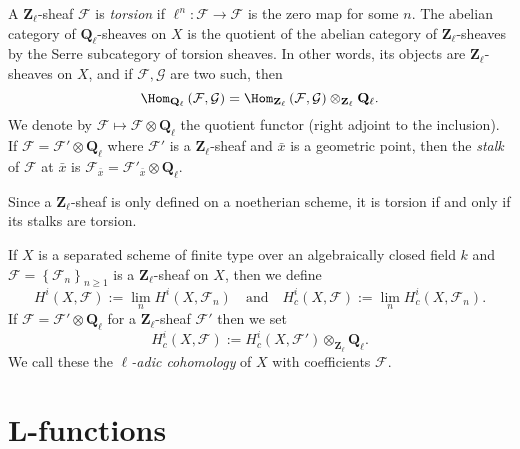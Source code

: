 \begin{definition}
\label{definition-torsion-l-adic-sheaf}
A $\mathbf{Z}_\ell$-sheaf $\mathcal{F}$ is {\it torsion} if
$\ell^n : \mathcal{F} \to \mathcal{F}$ is the zero map for some $n$.
The abelian category
of $\mathbf{Q}_\ell$-sheaves on $X$ is the quotient of the abelian category of
$\mathbf{Z}_\ell$-sheaves by the Serre subcategory of torsion sheaves. In
other words, its objects are $\mathbf{Z}_\ell$-sheaves on $X$, and if
$\mathcal{F}, \mathcal{G}$ are two such, then
$$
\Hom_{\mathbf{Q}_\ell} \left(\mathcal{F}, \mathcal{G} \right) =
\Hom_{\mathbf{Z}_\ell} \left(\mathcal{F}, \mathcal{G}\right)
\otimes_{\mathbf{Z}_\ell} \mathbf{Q}_\ell.
$$
We denote by $\mathcal{F} \mapsto \mathcal{F} \otimes \mathbf{Q}_\ell$ the
quotient functor (right adjoint to the inclusion). If $\mathcal{F} =
\mathcal{F}' \otimes \mathbf{Q}_\ell$ where $\mathcal{F}'$ is a
$\mathbf{Z}_\ell$-sheaf and $\bar x$ is a geometric point, then the
{\it stalk} of $\mathcal{F}$ at $\bar x$ is $\mathcal{F}_{\bar x} =
\mathcal{F}'_{\bar x} \otimes \mathbf{Q}_\ell$.
\end{definition}

\begin{remark}
\label{remark-torsion-stalks}
Since a $\mathbf{Z}_\ell$-sheaf is only defined on a noetherian scheme, it is
torsion if and only if its stalks are torsion.
\end{remark}

\begin{definition}
\label{definition-cohomology-l-adic}
If $X$ is a separated scheme of finite type over an algebraically closed field
$k$ and $\mathcal{F} = \left\{\mathcal{F}_n\right\}_{n\geq 1}$ is a
$\mathbf{Z}_\ell$-sheaf on $X$, then we define
$$
H^i(X, \mathcal{F}) := \lim_n H^i(X, \mathcal{F}_n)
\quad\text{and}\quad
H_c^i(X, \mathcal{F}) := \lim_n H_c^i(X, \mathcal{F}_n).
$$
If $\mathcal{F} = \mathcal{F}'\otimes \mathbf{Q}_\ell$ for a
$\mathbf{Z}_\ell$-sheaf $\mathcal{F}'$ then we set
$$
H_c^i(X , \mathcal{F}) := H_c^i(X,
\mathcal{F}')\otimes_{\mathbf{Z}_\ell}\mathbf{Q}_\ell.
$$
We call these the {\it $\ell$-adic cohomology} of $X$ with coefficients
$\mathcal{F}$.
\end{definition}





\section{L-functions}
\label{section-L-function}

